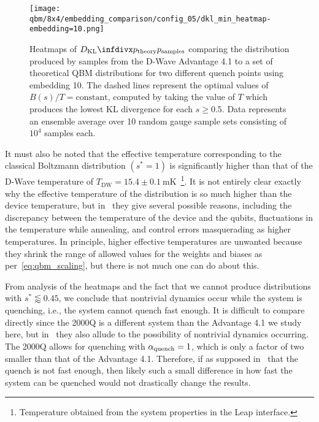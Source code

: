\begin{figure}[!htb]
    \begin{center}
        \texttt{[image: qbm/8x4/embedding\_comparison/config\_05/dkl\_min\_heatmap-embedding=10.png]}
    \end{center}
    \caption{
        Heatmaps of \( \DKL{\ptheory}{\psamples} \) comparing the distribution produced by samples from the D-Wave Advantage 4.1 to a set of theoretical QBM distributions for two different quench points using embedding 10.
        The dashed lines represent the optimal values of \( B(s) / T = \text{constant} \), computed by taking the value of \( T \) which produces the lowest KL divergence for each \( s \ge 0.5 \).
        Data represents an ensemble average over 10 random gauge sample sets consisting of \( 10^4 \) samples each.
    }
    \label{fig:dkl_min_heatmap}
\end{figure}

It must also be noted that the effective temperature corresponding to the classical Boltzmann distribution \( (s^* = 1) \) is significantly higher than that of the D-Wave temperature of \( T_\text{DW} = 15.4 \pm 0.1 \ \si{\milli\kelvin} \)~\cite{dwave_leap}\footnote{Temperature obtained from the system properties in the Leap interface.}.
It is not entirely clear exactly why the effective temperature of the distribution is so much higher than the device temperature, but in~\cite{marshall_2019} they give several possible reasons, including the discrepancy between the temperature of the device and the qubits, fluctuations in the temperature while annealing, and control errors masquerading as higher temperatures.
In principle, higher effective temperatures are unwanted because they shrink the range of allowed values for the weights and biases as per~\cref{eq:qbm_scaling}, but there is not much one can do about this.

From analysis of the heatmaps and the fact that we cannot produce distributions with \( s^* \lessapprox 0.45 \), we conclude that nontrivial dynamics occur while the system is quenching, i.e., the system cannot quench fast enough.
It is difficult to compare directly since the 2000Q is a different system than the Advantage 4.1 we study here, but in~\cite{marshall_2019} they also allude to the possibility of nontrivial dynamics occurring.
The 2000Q allows for quenching with \( \alpha_{\text{quench}} = 1 \), which is only a factor of two smaller than that of the Advantage 4.1.
Therefore, if as supposed in~\cite{marshall_2019} that the quench is not fast enough, then likely such a small difference in how fast the system can be quenched would not drastically change the results.

